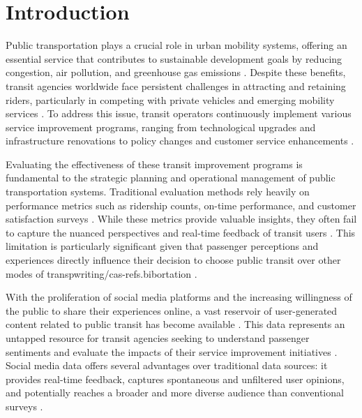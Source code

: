 \documentclass[a4paper,fleqn,12pt]{cas-sc}
\begin{document}
\maketitle
\setlength{\parindent}{15pt}
\setlength{\parskip}{0.1in}
\linenumbers

\section{Introduction}\label{sec:introduction}

Public transportation plays a crucial role in urban mobility systems, offering an essential service that contributes to sustainable development goals by reducing congestion, air pollution, and greenhouse gas emissions \citep{stjernborg2016role, mead2021road}. Despite these benefits, transit agencies worldwide face persistent challenges in attracting and retaining riders, particularly in competing with private vehicles and emerging mobility services \citep{beirAo2007understanding}. To address this issue, transit operators continuously implement various service improvement programs, ranging from technological upgrades and infrastructure renovations to policy changes and customer service enhancements \citep{luong2015public, fraser2024using}. 

Evaluating the effectiveness of these transit improvement programs is fundamental to the strategic planning and operational management of public transportation systems. Traditional evaluation methods rely heavily on performance metrics such as ridership counts, on-time performance, and customer satisfaction surveys \citep{nathanail2008measuring, eboli2011methodology}. While these metrics provide valuable insights, they often fail to capture the nuanced perspectives and real-time feedback of transit users \citep{collins2013novel}. This limitation is particularly significant given that passenger perceptions and experiences directly influence their decision to choose public transit over other modes of transpwriting/cas-refs.bibortation \citep{friman2001frequency, morton2016customer}.

With the proliferation of social media platforms and the increasing willingness of the public to share their experiences online, a vast reservoir of user-generated content related to public transit has become available \citep{golder2011diurnal, kaplan2010users}. This data represents an untapped resource for transit agencies seeking to understand passenger sentiments and evaluate the impacts of their service improvement initiatives \citep{el2019linking, zhang2023changes}. Social media data offers several advantages over traditional data sources: it provides real-time feedback, captures spontaneous and unfiltered user opinions, and potentially reaches a broader and more diverse audience than conventional surveys \citep{tasse2014using, haghighi2018using}.
\end{document}
